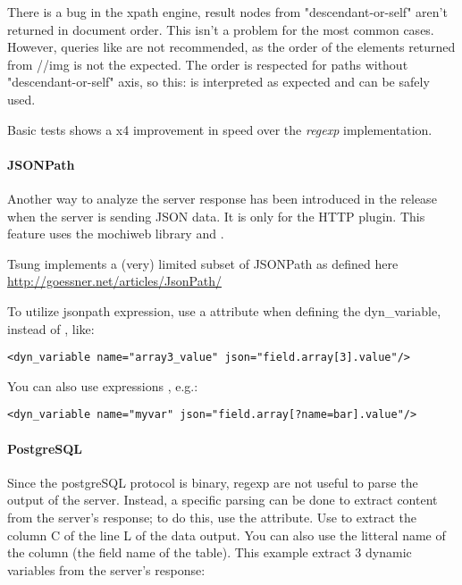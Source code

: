 \documentclass{TSUNG-en}
\begin{document}
There is a bug in the xpath engine, result nodes from "descendant-or-self" aren't returned in document order. This isn't a problem for the most common cases.
However, queries like  are not recommended, as the order of the  elements returned from //img is not the expected.
The order is respected for paths without "descendant-or-self" axis, so this:  is interpreted as expected and can be safely used.

Basic tests shows a x4 improvement in speed over the \emph{regexp} implementation.

\paragraph{JSONPath}

Another way to analyze the server response has been introduced in the
release  when the server is sending JSON data. It is only for the HTTP plugin. This feature uses the mochiweb library
and .

Tsung implements a (very) limited subset of JSONPath as defined here \url{http://goessner.net/articles/JsonPath/}

To utilize jsonpath expression, use a  attribute when
defining the dyn\_variable, instead of , like:
\begin{Verbatim}
<dyn_variable name="array3_value" json="field.array[3].value"/>
\end{Verbatim}

You can also use expressions , e.g.:
\begin{Verbatim}
<dyn_variable name="myvar" json="field.array[?name=bar].value"/>
\end{Verbatim}

\paragraph{PostgreSQL}

Since the  postgreSQL protocol is binary, regexp are not useful to
parse the output of the server. Instead, a specific parsing can be
done to extract content from the server's response; to do this, use the
 attribute. Use  to
extract the  column C of the  line L of the data output. You can also use
the litteral name of the column (\ie the field name of the
table). This example extract 3 dynamic variables from the server's
response:
\end{document}
